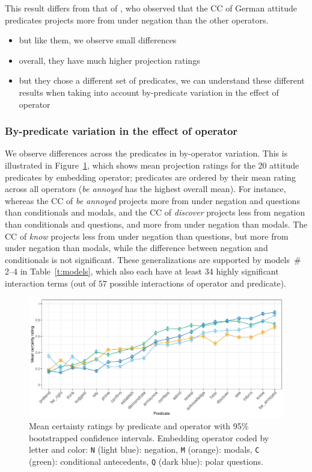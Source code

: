 \documentclass[a4paper,12pt,twoside]{article}
\begin{document}
			This result differs from that of \cite{sieker_projective_2022}, who observed that the CC of German attitude predicates projects more from under negation than the other operators.

			\begin{itemize}
				\item but like them, we observe small differences 
				\item overall, they have much higher projection ratings
				\item but they chose a different set of predicates, we can understand these different results when taking into account by-predicate variation in the effect of operator
			\end{itemize}

		\subsubsection{By-predicate variation in the effect of operator}

			We observe differences across the predicates in by-operator variation. This is illustrated in Figure~\ref{fig:op-pred-ratings}, which shows mean projection ratings for the 20 attitude predicates by embedding operator; predicates are ordered by their mean rating across all operators (\emph{be annoyed} has the highest overall mean).
			For instance, whereas the CC of \emph{be annoyed} projects more from under negation and questions than conditionals and modals, and the CC of \emph{discover} projects less from negation than conditionals and questions, and more from under negation than modals. The CC of \emph{know} projects less from under negation than questions, but more from under negation than modals, while the difference between negation and conditionals is not significant.
			These generalizations are supported by models\ \# 2--4 in Table\ \ref{t:models}, which also each have at least $34$ highly significant interaction terms (out of $57$ possible interactions of operator and predicate).

			\begin{figure}[ht]
				\centering
				\includegraphics[width = \linewidth]{projective-pred-op}
				\caption{Mean certainty ratings by predicate and operator with 95\% bootstrapped confidence intervals. Embedding operator coded by letter and color:  \texttt{N} (light blue): negation, \texttt{M} (orange): modals, \texttt{C} (green): conditional antecedents, \texttt{Q} (dark blue): polar questions.}
				\label{fig:op-pred-ratings}
			\end{figure}
\end{document}
